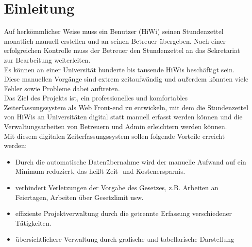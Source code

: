 \section{Einleitung}

Auf herkömmlicher Weise muss ein Benutzer (HiWi) seinen Stundenzettel monatlich manuell erstellen und an seinen Betreuer übergeben. Nach einer erfolgreichen Kontrolle muss der Betreuer den Stundenzettel an das Sekretariat zur Bearbeitung weiterleiten. \\

Es können an einer Universität hunderte bis tausende HiWis beschäftigt sein. Diese manuellen Vorgänge sind extrem zeitaufwändig und außerdem könnten viele Fehler sowie Probleme dabei auftreten.\\

Das Ziel des Projekts ist, ein professionelles und komfortables Zeiterfassungssystem als Web Front-end zu entwickeln, mit dem die Stundenzettel von HiWis an Universitäten digital statt manuell erfasst werden können und die Verwaltungsarbeiten von Betreuern und Admin erleichtern werden können.\\

Mit diesem digitalen Zeiterfassungssystem sollen folgende Vorteile erreicht werden:\\

\begin{itemize}
	\item Durch die automatische Datenübernahme wird der manuelle Aufwand auf ein Minimum reduziert, das heißt Zeit- und Kostenersparnis.
	\item verhindert Verletzungen der Vorgabe des Gesetzes, z.B. Arbeiten an Feiertagen, Arbeiten über Gesetzlimit usw.
	\item effiziente Projektverwaltung durch die getrennte Erfassung verschiedener Tätigkeiten.
	\item übersichtlichere Verwaltung durch grafische und tabellarische Darstellung

\end{itemize}
